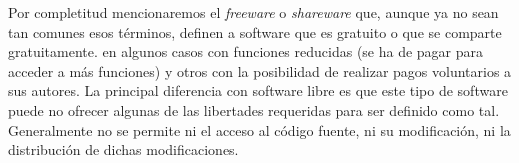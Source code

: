 Por completitud mencionaremos el \emph{freeware} o \emph{shareware} que, aunque ya no sean tan comunes esos términos, definen a software que es gratuito o que se comparte gratuitamente. en algunos casos con funciones reducidas (se ha de pagar para acceder a más funciones) y otros con la posibilidad de realizar pagos voluntarios a sus autores. La principal diferencia con software libre es que este tipo de software puede no ofrecer algunas de las libertades requeridas para ser definido como tal. Generalmente no se permite ni el acceso al código fuente, ni su modificación, ni la distribución de dichas modificaciones.

%
%





